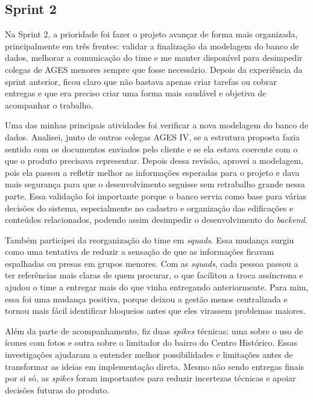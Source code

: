 \subsection{Sprint 2}

Na Sprint 2, a prioridade foi fazer o projeto avançar de forma mais organizada, principalmente em três frentes: validar a finalização da modelagem do banco de dados, melhorar a comunicação do time e me manter disponível para desimpedir colegas de AGES menores sempre que fosse necessário. Depois da experiência da sprint anterior, ficou claro que não bastava apenas criar tarefas ou cobrar entregas e que era preciso criar uma forma mais saudável e objetiva de acompanhar o trabalho.

Uma das minhas principais atividades foi verificar a nova modelagem do banco de dados. Analisei, junto de outros colegas AGES IV, se a estrutura proposta fazia sentido com os documentos enviados pelo cliente e se ela estava coerente com o que o produto precisava representar. Depois dessa revisão, aprovei a modelagem, pois ela passou a refletir melhor as informações esperadas para o projeto e dava mais segurança para que o desenvolvimento seguisse sem retrabalho grande nessa parte. Essa validação foi importante porque o banco servia como base para várias decisões do sistema, especialmente no cadastro e organização das edificações e conteúdos relacionados, podendo assim desimpedir o desenvolvimento do \textit{backend}.

Também participei da reorganização do time em \textit{squads}. Essa mudança surgiu como uma tentativa de reduzir a sensação de que as informações ficavam espalhadas ou presas em grupos menores. Com as \textit{squads}, cada pessoa passou a ter referências mais claras de quem procurar, o que facilitou a troca assíncrona e ajudou o time a entregar mais do que vinha entregando anteriormente. Para mim, essa foi uma mudança positiva, porque deixou a gestão menos centralizada e tornou mais fácil identificar bloqueios antes que eles virassem problemas maiores.

Além da parte de acompanhamento, fiz duas \textit{spikes} técnicas: uma sobre o uso de ícones com fotos e outra sobre o limitador do bairro do Centro Histórico. Essas investigações ajudaram a entender melhor possibilidades e limitações antes de transformar as ideias em implementação direta. Mesmo não sendo entregas finais por si só, as \textit{spikes} foram importantes para reduzir incertezas técnicas e apoiar decisões futuras do produto.

